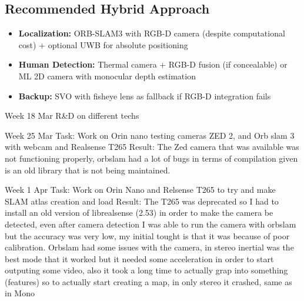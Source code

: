 \subsection*{Recommended Hybrid Approach}
\begin{itemize}
\item \textbf{Localization:} ORB-SLAM3 with RGB-D camera (despite computational cost) + optional UWB for absolute positioning
\item \textbf{Human Detection:} Thermal camera + RGB-D fusion (if concealable) or ML 2D camera with monocular depth estimation
\item \textbf{Backup:} SVO with fisheye lens as fallback if RGB-D integration fails
\end{itemize}




Week 18 Mar
R\&D on different techs

Week 25 Mar
Task: Work on Orin nano testing cameras ZED 2, and Orb slam 3 with webcam and Realsense T265
Result: The Zed camera that was available was not functioning properly, orbslam had a lot of bugs in terms of compilation given is an old library that is not being maintained.

Week 1 Apr
Task: Work on Orin Nano and Relsense T265 to try and make SLAM atlas creation and load
Result: The T265 was deprecated so I had to install an old version of librealsense (2.53) in order to make the camera be detected, even after camera detection I was able to run the camera with orbslam but the accuracy was very low, my initial tought is that it was because of poor calibration. Orbslam had some issues with the camera, in stereo inertial was the best mode that it worked but it needed some acceleration in order to start outputing some video, also it took a long time to actually grap into something (features) so to actually start creating a map, in only stereo it crashed, same as in Mono

